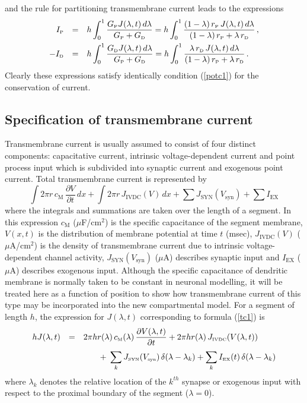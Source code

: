 and the rule for partitioning transmembrane current leads to the
expressions
\begin{equation}\label{potc3}
\begin{array}{rcl}
I_{\mbox{\tiny P}} & = & \displaystyle h\int_0^1 \frac{G_{\mbox{\tiny P}} J(\lambda,t)\,d\lambda}
{G_{\mbox{\tiny P}}+G_{\mbox{\tiny D}}}
= h\int_0^1 \frac{(1-\lambda)\,r_{\mbox{\tiny P}}\,
J(\lambda,t)\,d\lambda}{(1-\lambda)\,r_{\mbox{\tiny P}}
+\lambda\,r_{\mbox{\tiny D}}}\,,\\[10pt]
-I_{\mbox{\tiny D}} & = & \displaystyle h\int_0^1 \frac{G_{\mbox{\tiny D}} J(\lambda,t)\,d\lambda}
{G_{\mbox{\tiny P}}+G_{\mbox{\tiny D}}}
= h\int_0^1\frac{\lambda\,r_{\mbox{\tiny D}}\,J(\lambda,t)\,d\lambda}
{(1-\lambda)\,r_{\mbox{\tiny P}}+\lambda\,r_{\mbox{\tiny D}}}\,.
\end{array}
\end{equation}
Clearly these expressions satisfy identically condition (\ref{potc1}) for the
conservation of current.

\subsection{Specification of transmembrane current}

Transmembrane current is usually assumed to consist of four
distinct components: capacitative current, intrinsic
voltage-dependent current and point process input which is
subdivided into synaptic current and exogenous point current.
Total transmembrane current is represented by
\begin{equation}\label{tc1}
\int 2\pi r \,c_\mathrm{M}\,\frac{\partial V}{\partial t}\,dx
+\int 2\pi r\,J_\mathrm{IVDC}(V)\,dx+\sum
J_\mathrm{SYN}(V_\mathrm{syn}) +\sum I_\mathrm{EX}
\end{equation}
where the integrals and summations are taken over the length of a
segment. In this expression $c_\mathrm{M}$ ($\mu$F/cm$^2$) is the
specific capacitance of the segment membrane, $V(x,t)$ is the
distribution of membrane potential at time $t$ (msec),
$J_\mathrm{IVDC}(V)$ ($\mu$A/cm$^2$) is the density of
transmembrane current due to intrinsic voltage-dependent channel
activity, $J_\mathrm{SYN}(V_\mathrm{syn})$ ($\mu$A) describes
synaptic input and $I_\mathrm{EX}$ ($\mu$A) describes exogenous
input. Although the specific capacitance of dendritic membrane is
normally taken to be constant in neuronal modelling, it will be
treated here as a function of position to show how transmembrane
current of this type may be incorporated into the new
compartmental model. For a segment of length $h$, the expression
for $J(\lambda,t)$ corresponding to formula (\ref{tc1}) is
\begin{equation}\label{tc2}
\begin{array}{rcl}
h J(\lambda,t) & = & \displaystyle2\pi h
r(\lambda)\,c_{\mbox{\tiny M}}(\lambda)\,\frac{\partial
V(\lambda,t)}{\partial t}+2\pi h r(\lambda)\,J_{\mbox{\tiny IVDC}}(V(\lambda,t))\\[10pt]
&&\qquad \displaystyle+\;\sum_k
J_{\mbox{\tiny SYN}}(V_{\mbox{\tiny syn}})\,\delta(\lambda-\lambda_k) + \sum_k
I_{\mbox{\tiny EX}}(t)\,\delta(\lambda-\lambda_k)
\end{array}
\end{equation}
where $\lambda_k$ denotes the relative location of the $k^{th}$
synapse or exogenous input with respect to the proximal boundary
of the segment ($\lambda=0$).
